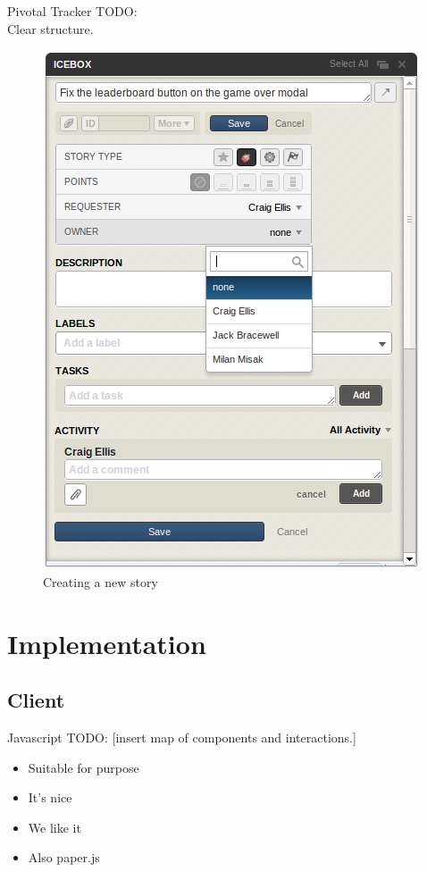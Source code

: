 \documentclass{beamer}
\begin{document}
\begin{frame}{Pivotal Tracker}
  TODO:\\
  Clear structure.\\
  \begin{figure}[hb]
    \centering
    \includegraphics[scale=0.25]{pivotal_new_story.png}
    \caption{Creating a new story}
  \end{figure}
\end{frame}


\section{Implementation}
\subsection{Client}

\begin{frame}{Javascript}
  TODO:
  [insert map of components and interactions.]
  \begin{itemize}
    \item Suitable for purpose
    \item It's nice
    \item We like it
    \item Also paper.js
  \end{itemize}
\end{frame}
\end{document}
